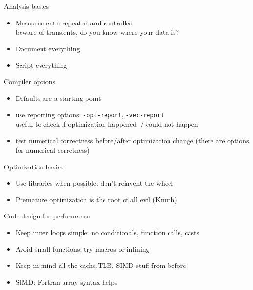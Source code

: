 
\begin{numberedframe}{Analysis basics}
  \begin{itemize}
  \item Measurements: repeated and controlled\\
    beware of transients, do you know where your data is?
  \item Document everything
  \item Script everything
  \end{itemize}
\end{numberedframe}

\begin{numberedframe}{Compiler options}
  \begin{itemize}
  \item Defaults are a starting point
  \item use reporting options: \texttt{-opt-report}, \texttt{-vec-report}\\
    useful to check if optimization happened~/ could not happen
  \item test numerical correctness before/after optimization change (there are options for numerical corretness)
  \end{itemize}
\end{numberedframe}

\begin{numberedframe}{Optimization basics}
  \begin{itemize}
  \item Use libraries when possible: don't reinvent the wheel
  \item Premature optimization is the root of all evil (Knuth)
  \end{itemize}
\end{numberedframe}

\begin{numberedframe}{Code design for performance}
  \begin{itemize}
  \item Keep inner loops simple: no conditionals, function calls, casts
  \item Avoid small functions: try macros or inlining
  \item Keep in mind all the cache,TLB, SIMD stuff from before
  \item SIMD: Fortran array syntax helps
  \end{itemize}
\end{numberedframe}

